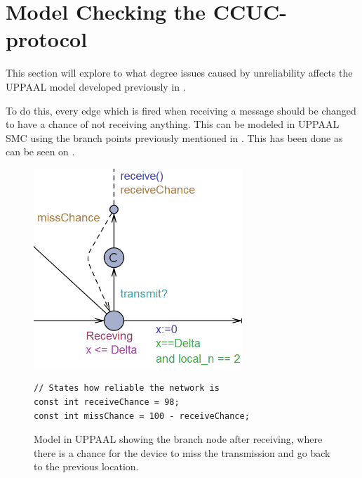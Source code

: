 \newpage
\section{Model Checking the CCUC-protocol}\label{sec:uppaalccuc}
This section will explore to what degree issues caused by unreliability affects the UPPAAL model developed previously in .

To do this, every edge which is fired when receiving a message should be changed to have a chance of not receiving anything. 
This can be modeled in UPPAAL SMC using the branch points previously mentioned in .
This has been done as can be seen on .

\begin{figure}[h]
\vspace{-5pt} 
\begin{minipage}{.48\textwidth}
\centering
\includegraphics[width=0.7\textwidth]{Figures/Model/MissChance_2.PNG}
\vspace{-10pt} 
\caption{Model in UPPAAL showing the branch node after receiving, where there is a chance for the device to miss the transmission and go back to the previous location.}
\label{fig:missTransmission}
\end{minipage} \hfill
\begin{minipage}{.45\textwidth}
\vspace{82pt}
\begin{lstlisting}[style=UPPAAL, caption={Specifying the reliability of the transmissions, the current numbers result in a 2 \% miss chance.}, label={unreliability-UPPAAL}]
// States how reliable the network is
const int receiveChance = 98;
const int missChance = 100 - receiveChance;
\end{lstlisting}
\end{minipage}
\end{figure} 

